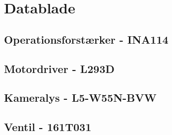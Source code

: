  \chapter{Datablade}
 \section{Operationsforstærker - INA114}


\section{Motordriver - L293D}


\section{Kameralys - L5-W55N-BVW}


\section{Ventil - 161T031}


